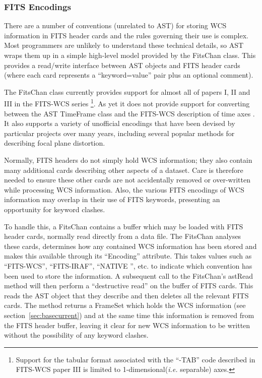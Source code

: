 \documentclass[final,authoryear,5p,times,twocolumn]{elsarticle}
\begin{document}
\subsubsection{FITS Encodings}
\label{sec:fitsencodings}
There are a number of conventions (unrelated to AST) for storing WCS
information in FITS header cards and the rules governing their use is
complex. Most programmers are unlikely to understand these technical
details, so AST wraps them up in a simple high-level model provided by
the FitsChan class. This provides a read/write interface between AST
objects and FITS header cards (where each card represents a
``keyword=value'' pair plus an optional comment).

The FitsChan class currently provides support for almost all of papers
I, II and III  in the FITS-WCS series \citep{FITSWCSI,FITSWCSII,FITSWCSIII}
\footnote{Support for the tabular format associated with the ``-TAB'' code
described in FITS-WCS paper III is limited to 1-dimensional(\emph{i.e.}
separable) axes.}. As yet it does not provide support for converting
between the AST TimeFrame class and the FITS-WCS description of time
axes \citep{FITSWCSIV}. It also supports a variety of unofficial encodings
that have been devised by particular projects over many years, including
several popular methods for describing focal plane distortion.

Normally, FITS headers do not simply hold WCS information; they also
contain many additional cards describing other aspects of a dataset. Care
is therefore needed to ensure these other cards are not accidentally
removed or over-written while processing WCS information. Also, the
various FITS encodings of WCS information may overlap in their use of
FITS keywords, presenting an opportunity for keyword clashes.

To handle this, a FitsChan contains a buffer which may be loaded with
FITS header cards, normally read directly from a data file. The FitsChan
analyses these cards, determines how any contained WCS information has
been stored and makes this available through its ``Encoding'' attribute.
This takes values such as ``FITS-WCS'', ``FITS-IRAF'', ``NATIVE '', etc. to
indicate which convention has been used to store the information. A
subsequent call to the FitsChan's astRead method will then perform a
``destructive read'' on the buffer of FITS cards. This reads the AST object
that they describe and then deletes all the relevant FITS cards. The
method returns a FrameSet which holds the WCS information (see
section~\ref{sec:basecurrent}) and at the same time this information is
removed from the FITS header buffer, leaving it clear for new WCS
information to be written without the possibility of any keyword clashes.
\end{document}
